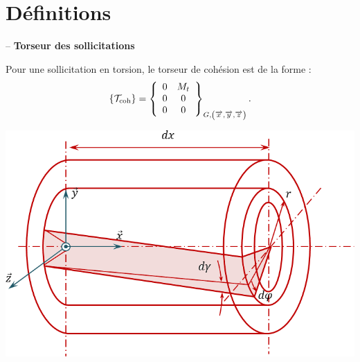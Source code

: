 \documentclass[10pt,fleqn]{article} %
\begin{document}

\vspace{2cm}
\pagestyle{fancy}
\thispagestyle{plain}

\section{Définitions}
\begin{defi} -- \textbf{Torseur des sollicitations}  ~\\

\begin{minipage}[c]{.65\linewidth}
Pour une sollicitation en torsion, le torseur de cohésion est de la forme : 
$$
\{\mathcal{T}_{\text{coh}}\} = \torseurcol{0}{0}{0}{M_t}{0}{0}{G,\left(\vx{}, \vy{}, \vz{} \right)}.$$
\end{minipage} \hfill
\begin{minipage}[c]{.3\linewidth}
\begin{center}
\includegraphics[width=\linewidth]{images/torsion}
\end{center}
\end{minipage}



\end{defi}
\end{document}
